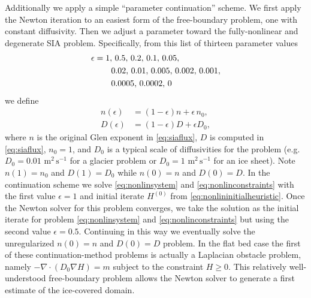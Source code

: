 \documentclass[twocolumn,letterpaper]{igs}
\newcommand{\Div}{\nabla\cdot}
\newcommand\eps{\epsilon}
\newcommand{\grad}{\nabla}
\begin{document}
Additionally we apply a simple ``parameter continuation'' scheme.  We first apply the Newton iteration to an easiest form of the free-boundary problem, one with constant diffusivity.  Then we adjust a parameter toward the fully-nonlinear and degenerate SIA problem.  Specifically, from this list of thirteen parameter values
\begin{align}
\eps &= 1,\, 0.5,\, 0.2,\, 0.1,\, 0.05, \label{eq:continuationseq} \\
     &\qquad 0.02,\, 0.01,\, 0.005,\, 0.002,\, 0.001, \notag \\
     &\qquad 0.0005,\, 0.0002,\, 0 \notag
\end{align}
we define
\begin{align}
n(\eps) &= (1-\eps) n + \eps\, n_0,  \label{eq:continuationn} \\
D(\eps) &= (1-\eps) D + \eps D_0,  \label{eq:continuationD}
\end{align}
where $n$ is the original Glen exponent in \eqref{eq:siaflux}, $D$ is computed in \eqref{eq:siaflux}, $n_0=1$, and $D_0$ is a typical scale of diffusivities for the problem (e.g.~$D_0=0.01$ $\text{m}^2\,\text{s}^{-1}$ for a glacier problem or $D_0=1$ $\text{m}^2\,\text{s}^{-1}$ for an ice sheet).  Note $n(1)=n_0$ and $D(1)=D_0$ while $n(0)=n$ and $D(0)=D$.   In the continuation scheme we solve \eqref{eq:nonlinsystem} and \eqref{eq:nonlinconstraints} with the first value $\eps=1$ and initial iterate $H^{(0)}$ from \eqref{eq:nonlininitialheuristic}.  Once the Newton solver for this problem converges, we take the solution as the initial iterate for problem \eqref{eq:nonlinsystem} and \eqref{eq:nonlinconstraints} but using the second value $\eps=0.5$.  Continuing in this way we eventually solve the unregularized $n(0)=n$ and $D(0)=D$ problem.  In the flat bed case the first of these continuation-method problems is actually a Laplacian obstacle problem, namely $-\Div(D_0 \grad H) = m$ subject to the constraint $H\ge 0$.  This relatively well-understood free-boundary problem \citep{KinderlehrerStampacchia1980} allows the Newton solver to generate a first estimate of the ice-covered domain.
\end{document}
